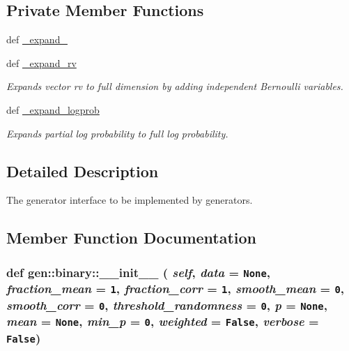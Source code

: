 \subsection*{Private Member Functions}
\begin{CompactItemize}
\item 
def \hyperlink{classgen_1_1binary_621bfe54add415f43a7b206b4eef4913}{\_\-expand\_}
\item 
def \hyperlink{classgen_1_1binary_4d26e77dfacc2f6cfc603d7995e25752}{\_\-expand\_\-rv}
\begin{CompactList}\small\item\em Expands vector rv to full dimension by adding independent Bernoulli variables. \item\end{CompactList}\item 
def \hyperlink{classgen_1_1binary_6c3df954e07beb8cac3fca8b0e29865c}{\_\-expand\_\-logprob}
\begin{CompactList}\small\item\em Expands partial log probability to full log probability. \item\end{CompactList}\end{CompactItemize}


\subsection{Detailed Description}
The generator interface to be implemented by generators. 

\subsection{Member Function Documentation}
\hypertarget{classgen_1_1binary_705669a0b9879ed4c0f3b1d7ebac7163}{
\subsubsection[{\_\-\_\-init\_\-\_\-}]{\setlength{\rightskip}{0pt plus 5cm}def gen::binary::\_\-\_\-init\_\-\_\- ( {\em self}, \/   {\em data} = {\tt None}, \/   {\em fraction\_\-mean} = {\tt 1}, \/   {\em fraction\_\-corr} = {\tt 1}, \/   {\em smooth\_\-mean} = {\tt 0}, \/   {\em smooth\_\-corr} = {\tt 0}, \/   {\em threshold\_\-randomness} = {\tt 0}, \/   {\em p} = {\tt None}, \/   {\em mean} = {\tt None}, \/   {\em min\_\-p} = {\tt 0}, \/   {\em weighted} = {\tt False}, \/   {\em verbose} = {\tt False})}}
\label{classgen_1_1binary_705669a0b9879ed4c0f3b1d7ebac7163}




